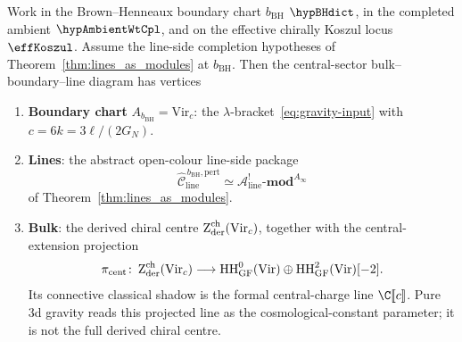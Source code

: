 \begin{theorem}
\label{thm:gravity-koszul-triangle}
Work in the Brown--Henneaux boundary chart \(b_{\mathrm{BH}}\)
\(\hypBHdict\), in the completed ambient \(\hypAmbientWtCpl\), and on
the effective chirally Koszul locus \(\effKoszul\).  Assume the
line-side completion hypotheses of Theorem~\textup{\ref{thm:lines_as_modules}}
at \(b_{\mathrm{BH}}\).  Then the central-sector
bulk--boundary--line diagram has vertices
\begin{enumerate}[label=\textup{(\roman*)}]
\item \textbf{Boundary chart} \(A_{b_{\mathrm{BH}}}=\mathrm{Vir}_c\):
 the $\lambda$-bracket~\eqref{eq:gravity-input} with
 \(c = 6k = 3\ell/(2G_N)\).
\item \textbf{Lines}: the abstract open-colour line-side package
 \[
 \widehat{\mathcal C}^{\,b_{\mathrm{BH}},\mathrm{pert}}_{\mathrm{line}}
 \simeq
 \mathcal A^{!}_{\mathrm{line}}\text{-}\mathbf{mod}^{A_\infty}
 \]
 of Theorem~\ref{thm:lines_as_modules}.
\item \textbf{Bulk}: the derived chiral centre
 \(\operatorname{Z}_{\mathrm{der}}^{\mathrm{ch}}(\mathrm{Vir}_c)\), together with the
 central-extension projection
 \[
 \pi_{\mathrm{cent}}\colon
 \operatorname{Z}_{\mathrm{der}}^{\mathrm{ch}}(\mathrm{Vir}_c)
 \longrightarrow
 \operatorname{HH}^0_{\mathrm{GF}}(\mathrm{Vir})\oplus
 \operatorname{HH}^2_{\mathrm{GF}}(\mathrm{Vir})[-2].
 \]
 Its connective classical shadow is the formal central-charge line
 \(\C[\![c]\!]\).  Pure 3d gravity reads this projected line as the
 cosmological-constant parameter; it is not the full derived chiral
 centre.
\end{enumerate}
\end{theorem}

